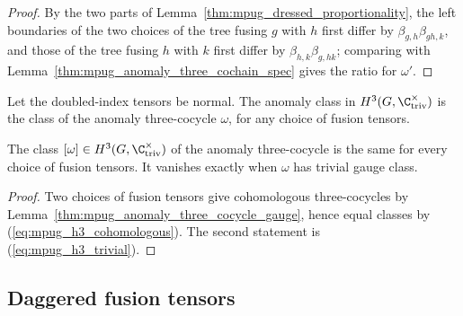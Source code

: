 \begin{proof}\leanok
    By the two parts of Lemma~\ref{thm:mpug_dressed_proportionality}, the
    left boundaries of the two choices of the tree fusing $g$ with $h$
    first differ by $\beta_{g,h}\beta_{gh,k}$, and those of the tree fusing
    $h$ with $k$ first differ by $\beta_{h,k}\beta_{g,hk}$; comparing with
    Lemma~\ref{thm:mpug_anomaly_three_cochain_spec} gives the ratio for
    $\omega'$.
\end{proof}

\begin{definition}
    \label{def:mpug_anomaly_class}
    \leanok
    Let the doubled-index tensors be normal. The anomaly class in
    $H^3(G,\C^\times_{\mathrm{triv}})$ is the class of the anomaly
    three-cocycle $\omega$, for any choice of fusion tensors.
\end{definition}

\begin{corollary}
    \label{cor:mpug_anomaly_class}
    \leanok
    The class $[\omega]\in H^3(G,\C^\times_{\mathrm{triv}})$ of the anomaly
    three-cocycle is the same for every choice of fusion tensors. It vanishes
    exactly when $\omega$ has trivial gauge class.
\end{corollary}

\begin{proof}\leanok
    Two choices of fusion tensors give cohomologous three-cocycles by
    Lemma~\ref{thm:mpug_anomaly_three_cocycle_gauge}, hence equal classes
    by (\ref{eq:mpug_h3_cohomologous}). The second statement is
    (\ref{eq:mpug_h3_trivial}).
\end{proof}

\subsection{Daggered fusion tensors}

